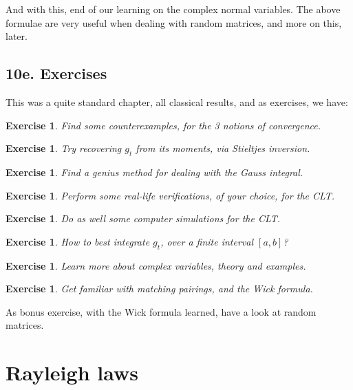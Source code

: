 \documentclass[12pt]{amsbook}
\newtheorem{exercise}[theorem]{Exercise}
\begin{document}
And with this, end of our learning on the complex normal variables. The above formulae are very useful when dealing with random matrices, and more on this, later.

\section*{10e. Exercises}

This was a quite standard chapter, all classical results, and as exercises, we have:

\begin{exercise}
Find some counterexamples, for the 3 notions of convergence.
\end{exercise}

\begin{exercise}
Try recovering $g_t$ from its moments, via Stieltjes inversion.
\end{exercise}

\begin{exercise}
Find a genius method for dealing with the Gauss integral.
\end{exercise}

\begin{exercise}
Perform some real-life verifications, of your choice, for the CLT.
\end{exercise}

\begin{exercise}
Do as well some computer simulations for the CLT.
\end{exercise}

\begin{exercise}
How to best integrate $g_t$, over a finite interval $[a,b]$?
\end{exercise}

\begin{exercise}
Learn more about complex variables, theory and examples.
\end{exercise}

\begin{exercise}
Get familiar with matching pairings, and the Wick formula.
\end{exercise}

As bonus exercise, with the Wick formula learned, have a look at random matrices.

\chapter{Rayleigh laws}
\end{document}
